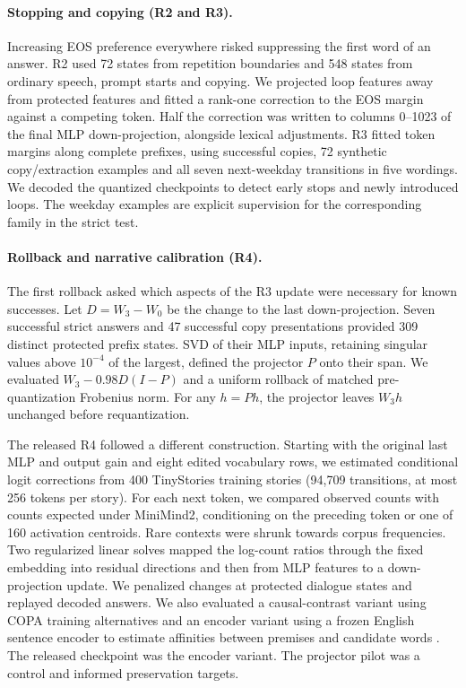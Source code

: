 \documentclass[11pt]{article}
\begin{document}
\paragraph{Stopping and copying (R2 and R3).}
Increasing EOS preference everywhere risked suppressing the first word of an answer. R2 used 72 states from repetition boundaries and 548 states from ordinary speech, prompt starts and copying. We projected loop features away from protected features and fitted a rank-one correction to the EOS margin against a competing token. Half the correction was written to columns 0--1023 of the final MLP down-projection, alongside lexical adjustments. R3 fitted token margins along complete prefixes, using successful copies, 72 synthetic copy/extraction examples and all seven next-weekday transitions in five wordings. We decoded the quantized checkpoints to detect early stops and newly introduced loops. The weekday examples are explicit supervision for the corresponding family in the strict test.

\paragraph{Rollback and narrative calibration (R4).}
The first rollback asked which aspects of the R3 update were necessary for known successes. Let $D=W_3-W_0$ be the change to the last down-projection. Seven successful strict answers and 47 successful copy presentations provided 309 distinct protected prefix states. SVD of their MLP inputs, retaining singular values above $10^{-4}$ of the largest, defined the projector $P$ onto their span. We evaluated $W_3-0.98D(I-P)$ and a uniform rollback of matched pre-quantization Frobenius norm. For any $h=Ph$, the projector leaves $W_3h$ unchanged before requantization.

The released R4 followed a different construction. Starting with the original last MLP and output gain and eight edited vocabulary rows, we estimated conditional logit corrections from 400 TinyStories training stories (94,709 transitions, at most 256 tokens per story). For each next token, we compared observed counts with counts expected under MiniMind2, conditioning on the preceding token or one of 160 activation centroids. Rare contexts were shrunk towards corpus frequencies. Two regularized linear solves mapped the log-count ratios through the fixed embedding into residual directions and then from MLP features to a down-projection update. We penalized changes at protected dialogue states and replayed decoded answers. We also evaluated a causal-contrast variant using COPA training alternatives and an encoder variant using a frozen English sentence encoder to estimate affinities between premises and candidate words \citep{encoder}. The released checkpoint was the encoder variant. The projector pilot was a control and informed preservation targets.
\end{document}
